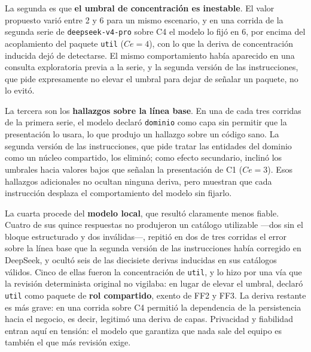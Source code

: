 La segunda es que \textbf{el umbral de concentración es inestable}. El valor propuesto varió entre 2 y 6 para un mismo escenario, y en una corrida de la segunda serie de \texttt{deepseek-v4-pro} sobre C4 el modelo lo fijó en 6, por encima del acoplamiento del paquete \texttt{util} ($Ce = 4$), con lo que la deriva de concentración inducida dejó de detectarse. El mismo comportamiento había aparecido en una consulta exploratoria previa a la serie, y la segunda versión de las instrucciones, que pide expresamente no elevar el umbral para dejar de señalar un paquete, no lo evitó.

La tercera son los \textbf{hallazgos sobre la línea base}. En una de cada tres corridas de la primera serie, el modelo declaró \texttt{dominio} como capa sin permitir que la presentación lo usara, lo que produjo un hallazgo sobre un código sano. La segunda versión de las instrucciones, que pide tratar las entidades del dominio como un núcleo compartido, los eliminó; como efecto secundario, inclinó los umbrales hacia valores bajos que señalan la presentación de C1 ($Ce = 3$). Esos hallazgos adicionales no ocultan ninguna deriva, pero muestran que cada instrucción desplaza el comportamiento del modelo sin fijarlo.

La cuarta procede del \textbf{modelo local}, que resultó claramente menos fiable. Cuatro de sus quince respuestas no produjeron un catálogo utilizable ---dos sin el bloque estructurado y dos inválidas---, repitió en dos de tres corridas el error sobre la línea base que la segunda versión de las instrucciones había corregido en DeepSeek, y ocultó seis de las diecisiete derivas inducidas en sus catálogos válidos. Cinco de ellas fueron la concentración de \texttt{util}, y lo hizo por una vía que la revisión determinista original no vigilaba: en lugar de elevar el umbral, declaró \texttt{util} como paquete de \textbf{rol compartido}, exento de FF2 y FF3. La deriva restante es más grave: en una corrida sobre C4 permitió la dependencia de la persistencia hacia el negocio, es decir, legitimó una deriva de capas. Privacidad y fiabilidad entran aquí en tensión: el modelo que garantiza que nada sale del equipo es también el que más revisión exige.

